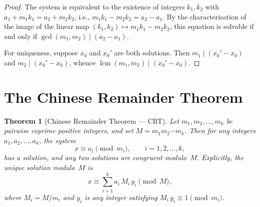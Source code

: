 \documentclass[12pt,a4paper,openany]{book}
\theoremstyle{definition}
\theoremstyle{plain}
\newtheorem{theorem}[definition]{Theorem}
\theoremstyle{remark}
\DeclareMathOperator{\lcm}{lcm}
\begin{document}
\begin{proof}
The system is equivalent to the existence of integers $k_1, k_2$ with
$a_1 + m_1 k_1 = a_2 + m_2 k_2$, i.e., $m_1 k_1 - m_2 k_2 = a_2 - a_1$.
By the characterisation of the image of the linear map
$(k_1, k_2) \mapsto m_1 k_1 - m_2 k_2$, this equation is solvable if and only if
$\gcd(m_1, m_2) \mid (a_2 - a_1)$.

For uniqueness, suppose $x_0$ and $x_0'$ are both solutions. Then
$m_1 \mid (x_0' - x_0)$ and $m_2 \mid (x_0' - x_0)$, whence
$\lcm(m_1, m_2) \mid (x_0' - x_0)$.
\end{proof}

\section{The Chinese Remainder Theorem}
\label{sec:crt-statement}

\begin{theorem}[Chinese Remainder Theorem --- CRT]
\label{thm:crt}
Let $m_1, m_2, \ldots, m_k$ be pairwise coprime positive integers, and set
$M = m_1 m_2 \cdots m_k$. Then for any integers $a_1, a_2, \ldots, a_k$, the system
\begin{equation}
\label{eq:crt-system}
  x \equiv a_i \pmod{m_i}, \qquad i = 1, 2, \ldots, k,
\end{equation}
has a solution, and any two solutions are congruent modulo~$M$.
Explicitly, the unique solution modulo~$M$ is
\begin{equation}
\label{eq:crt-formula}
  x \equiv \sum_{i=1}^{k} a_i \, M_i \, y_i \pmod{M},
\end{equation}
where $M_i = M / m_i$ and $y_i$ is any integer satisfying $M_i \, y_i \equiv 1 \pmod{m_i}$.
\end{theorem}
\end{document}
